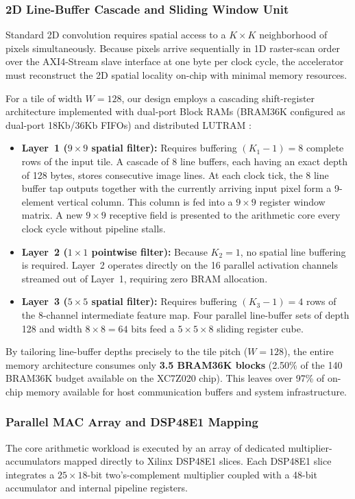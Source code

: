\documentclass[conference]{IEEEtran}
\begin{document}
\subsubsection{2D Line-Buffer Cascade and Sliding Window Unit}
Standard 2D convolution requires spatial access to a $K \times K$ neighborhood of pixels simultaneously. Because pixels arrive sequentially in 1D raster-scan order over the AXI4-Stream slave interface at one byte per clock cycle, the accelerator must reconstruct the 2D spatial locality on-chip with minimal memory resources. 

For a tile of width $W = 128$, our design employs a cascading shift-register architecture implemented with dual-port Block RAMs (BRAM36K configured as dual-port 18Kb/36Kb FIFOs) and distributed LUTRAM \cite{peemen2013memory, mittal2020survey}:
\begin{itemize}
    \item \textbf{Layer~1 ($9 \times 9$ spatial filter):} Requires buffering $(K_1 - 1) = 8$ complete rows of the input tile. A cascade of 8 line buffers, each having an exact depth of 128 bytes, stores consecutive image lines. At each clock tick, the 8 line buffer tap outputs together with the currently arriving input pixel form a 9-element vertical column. This column is fed into a $9 \times 9$ register window matrix. A new $9 \times 9$ receptive field is presented to the arithmetic core every clock cycle without pipeline stalls.
    \item \textbf{Layer~2 ($1 \times 1$ pointwise filter):} Because $K_2 = 1$, no spatial line buffering is required. Layer~2 operates directly on the 16 parallel activation channels streamed out of Layer~1, requiring zero BRAM allocation.
    \item \textbf{Layer~3 ($5 \times 5$ spatial filter):} Requires buffering $(K_3 - 1) = 4$ rows of the 8-channel intermediate feature map. Four parallel line-buffer sets of depth 128 and width $8 \times 8 = 64\text{ bits}$ feed a $5 \times 5 \times 8$ sliding register cube.
\end{itemize}
By tailoring line-buffer depths precisely to the tile pitch ($W = 128$), the entire memory architecture consumes only \textbf{3.5 BRAM36K blocks} (2.50\% of the 140 BRAM36K budget available on the XC7Z020 chip). This leaves over 97\% of on-chip memory available for host communication buffers and system infrastructure.

\subsubsection{Parallel MAC Array and DSP48E1 Mapping}
The core arithmetic workload is executed by an array of dedicated multiplier-accumulators mapped directly to Xilinx DSP48E1 slices. Each DSP48E1 slice integrates a $25 \times 18$-bit two's-complement multiplier coupled with a 48-bit accumulator and internal pipeline registers.
\end{document}
